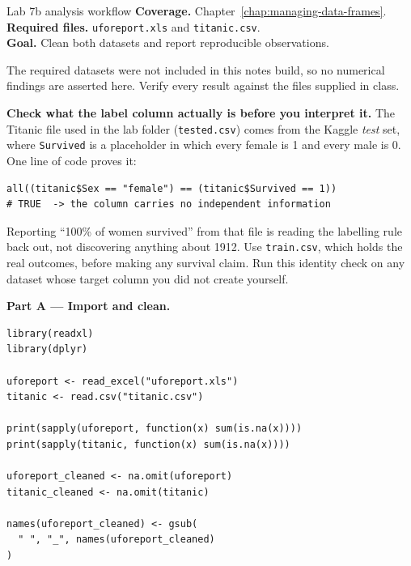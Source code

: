 
\begin{labproject}{Lab 7b analysis workflow}
\textbf{Coverage.} Chapter~\ref{chap:managing-data-frames}.\\
\textbf{Required files.} \texttt{uforeport.xls} and \texttt{titanic.csv}.\\
\textbf{Goal.} Clean both datasets and report reproducible observations.

\begin{pitfall}
The required datasets were not included in this notes build, so no numerical findings are asserted here. Verify every result against the files supplied in class.
\end{pitfall}

\begin{pitfall}
\textbf{Check what the label column actually is before you interpret it.} The Titanic file used in the lab folder (\texttt{tested.csv}) comes from the Kaggle \emph{test} set, where \texttt{Survived} is a placeholder in which every female is 1 and every male is 0. One line of code proves it:

\begin{lstlisting}[style=dsr]
all((titanic$Sex == "female") == (titanic$Survived == 1))
# TRUE  -> the column carries no independent information
\end{lstlisting}

Reporting ``100\% of women survived'' from that file is reading the labelling rule back out, not discovering anything about 1912. Use \texttt{train.csv}, which holds the real outcomes, before making any survival claim. Run this identity check on any dataset whose target column you did not create yourself.
\end{pitfall}

\textbf{Part A --- Import and clean.}

\begin{lstlisting}[style=dsr]
library(readxl)
library(dplyr)

uforeport <- read_excel("uforeport.xls")
titanic <- read.csv("titanic.csv")

print(sapply(uforeport, function(x) sum(is.na(x))))
print(sapply(titanic, function(x) sum(is.na(x))))

uforeport_cleaned <- na.omit(uforeport)
titanic_cleaned <- na.omit(titanic)

names(uforeport_cleaned) <- gsub(
  " ", "_", names(uforeport_cleaned)
)
\end{lstlisting}


\end{labproject}
